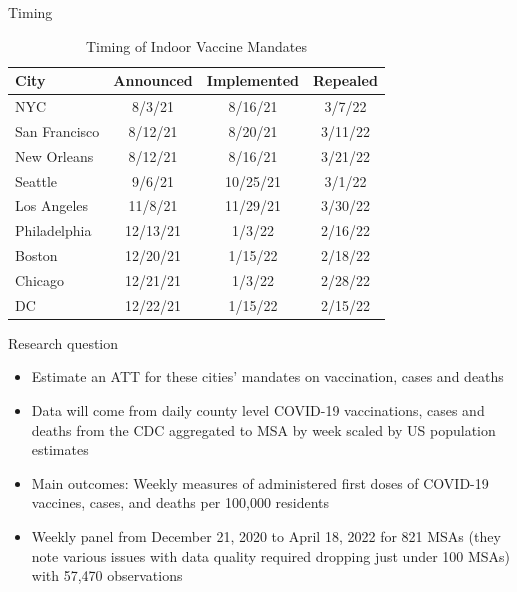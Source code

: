 \documentclass{beamer}
\begin{document}
\begin{frame}{Timing}


\begin{table}[ht]
\centering
\caption{Timing of Indoor Vaccine Mandates}
\begin{tabular}{lccc}
\toprule\toprule
City          &  Announced &  Implemented &  Repealed \\ \midrule
NYC           & 8/3/21     & 8/16/21       & 3/7/22    \\
San Francisco & 8/12/21     & 8/20/21       & 3/11/22    \\
New Orleans   & 8/12/21     & 8/16/21       & 3/21/22    \\
Seattle       & 9/6/21     & 10/25/21       & 3/1/22    \\
Los Angeles   & 11/8/21     & 11/29/21       & 3/30/22    \\
Philadelphia  & 12/13/21     & 1/3/22       & 2/16/22    \\
Boston        & 12/20/21     & 1/15/22       & 2/18/22    \\
Chicago       & 12/21/21     & 1/3/22       & 2/28/22    \\
DC            & 12/22/21     & 1/15/22       & 2/15/22    \\ \bottomrule\bottomrule
\end{tabular}
\end{table}


\end{frame}

\begin{frame}{Research question}

\begin{itemize}
\item Estimate an ATT for these cities' mandates on vaccination, cases and deaths
\item Data will come from daily county level COVID-19 vaccinations, cases and deaths from the CDC aggregated to MSA by week scaled by US population estimates
\item Main outcomes: Weekly measures of administered first doses of COVID-19 vaccines, cases, and deaths per 100,000 residents
\item Weekly panel from December 21, 2020 to April 18, 2022 for 821 MSAs (they note various issues with data quality required dropping just under 100 MSAs) with 57,470 observations
\end{itemize}

\end{frame}
\end{document}
